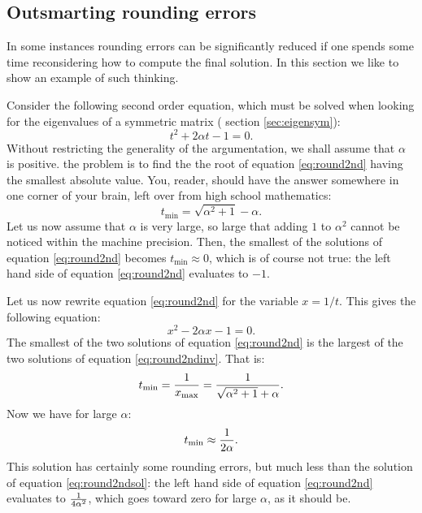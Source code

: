 \documentclass[twoside]{book}
\begin{document}
\subsection{Outsmarting rounding errors}
\label{sec:outsmart} In some instances rounding errors can be
significantly reduced if one spends some time reconsidering how to
compute the final solution. In this section we like to show an
example of such thinking.

Consider the following second order equation, which must be solved
when looking for the eigenvalues of a symmetric matrix (\cf
section \ref{sec:eigensym}):
\begin{equation}
\label{eq:round2nd}
  t^2+2\alpha t - 1 =0.
\end{equation}
Without restricting the generality of the argumentation, we shall
assume that $\alpha$ is positive. the problem is to find the the
root of equation \ref{eq:round2nd} having the smallest absolute
value. You, reader, should have the answer somewhere in one corner
of your brain, left over from high school mathematics:
\begin{equation}
\label{eq:round2ndsol}
  t_{\min}=\sqrt{\alpha^2+1} - \alpha.
\end{equation}
Let us now assume that $\alpha$ is very large, so large that
adding $1$ to $\alpha^2$ cannot be noticed within the machine
precision. Then, the smallest of the solutions of equation
\ref{eq:round2nd} becomes $t_{\min}\approx 0$, which is of course
not true: the left hand side of equation  \ref{eq:round2nd}
evaluates to $-1$.

\noindent Let us now rewrite equation \ref{eq:round2nd} for the
variable $x=1/t$. This gives the following equation:
\begin{equation}
\label{eq:round2ndinv}
  x^2-2\alpha x - 1 =0.
\end{equation}
The smallest of the two solutions of equation \ref{eq:round2nd} is
the largest of the two solutions of equation \ref{eq:round2ndinv}.
That is:
\begin{equation}
  t_{\min}={1\over x_{\max}}={1 \over \sqrt{\alpha^2+1} + \alpha}.
\end{equation}
Now we have for large $\alpha$:
\begin{equation}
  t_{\min}\approx {1\over 2\alpha}.
\end{equation}
This solution has certainly some rounding errors, but much less
than the solution of equation \ref{eq:round2ndsol}: the left hand
side of equation \ref{eq:round2nd} evaluates to ${1\over
4\alpha^2}$, which goes toward zero for large $\alpha$, as it
should be.
\end{document}
